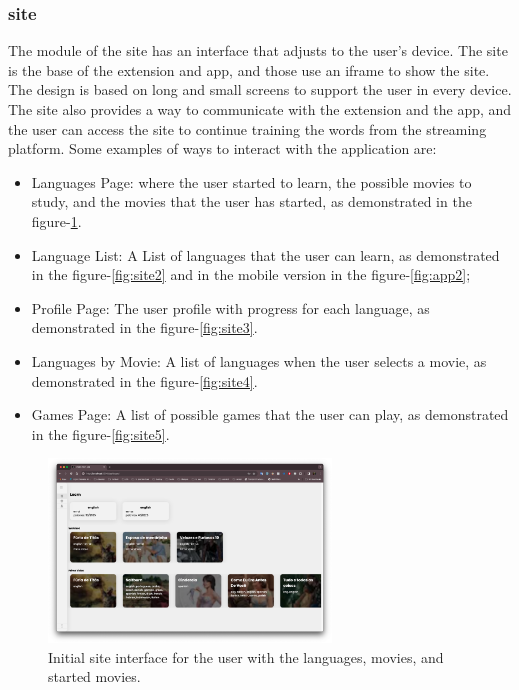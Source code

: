 \documentclass[12pt]{article}
\begin{document}
\subsubsection{site}
The module of the site has an interface that adjusts to the user's device. The site is the base of the extension and app, and those use an iframe to show the site. The design is based on long and small screens to support the user in every device. The site also provides a way to communicate with the extension and the app, and the user can access the site to continue training the words from the streaming platform. Some examples of ways to interact with the application are:
\begin{itemize}
\item   Languages Page: where the user started to learn, the possible movies to study, and the movies that the user has started, as demonstrated in the figure-\ref{fig:site1}.
\item Language List: A List of languages that the user can learn, as demonstrated in the figure-\ref{fig:site2} and in the mobile version in the figure-\ref{fig:app2};
\item Profile Page: The user profile with progress for each language, as demonstrated in the figure-\ref{fig:site3}.
\item Languages by Movie: A list of languages when the user selects a movie, as demonstrated in the figure-\ref{fig:site4}.
\item Games Page: A list of possible games that the user can play, as demonstrated in the figure-\ref{fig:site5}.
\end{itemize}
  \begin{figure}[!h]
   \centering
   \caption{
   Initial site interface for the user with the languages, movies, and started movies.
    }
   \label{fig:site1}
   \includegraphics[width=0.67\textwidth]{assets/20.png}
  \end{figure}
\end{document}
